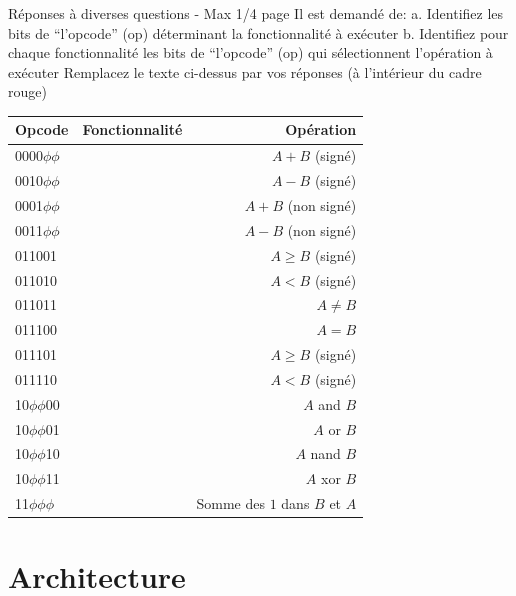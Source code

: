 \documentclass[a4paper]{article}
\begin{document}
	
\begin{tcolorbox}[colframe=Monokaimagenta,colback=white]
Réponses à diverses questions - Max 1/4 page 
Il est demandé de: 
a. Identifiez les bits de “l’opcode” (op) déterminant la fonctionnalité à exécuter
b. Identifiez pour chaque fonctionnalité les bits de “l’opcode” (op) qui sélectionnent l’opération à exécuter
Remplacez le texte ci-dessus par vos réponses (à l’intérieur du cadre rouge)\\

\begin{tabular}{ l | c |r }
    \hline
    Opcode           &  Fonctionnalité & Opération\\
    \hline
    0000$\phi\phi$   &     \nameref{add_Sub}    & $A+B$ (signé) \\
    0010$\phi\phi$   &                 & $A-B$ (signé) \\
    0001$\phi\phi$   &                 & $A+B$ (non signé) \\
    0011$\phi\phi$   &                 & $A-B$ (non signé) \\
    \hline
    011001           &  \nameref{comp} & $A \ge B$ (signé) \\
    011010           &                 & $A < B$ (signé) \\
    011011           &                 & $A \ne B$\\
    011100           &                 & $A = B$ \\
    011101           &                 & $A \ge B$ (signé) \\
    011110           &                 & $A < B$ (signé) \\
    \hline
    10$\phi\phi$00   &\nameref{logique}& $A$ and $B$\\
    10$\phi\phi$01   &                 & $A$ or $B$\\
    10$\phi\phi$10   &                 & $A$ nand $B$\\
    10$\phi\phi$11   &                 & $A$ xor $B$\\
    \hline
    11$\phi\phi\phi$ & \nameref{custom}& Somme des $1$ dans $B$ et $A$
     
\end{tabular}

\end{tcolorbox}

\section{Architecture}
\end{document}
